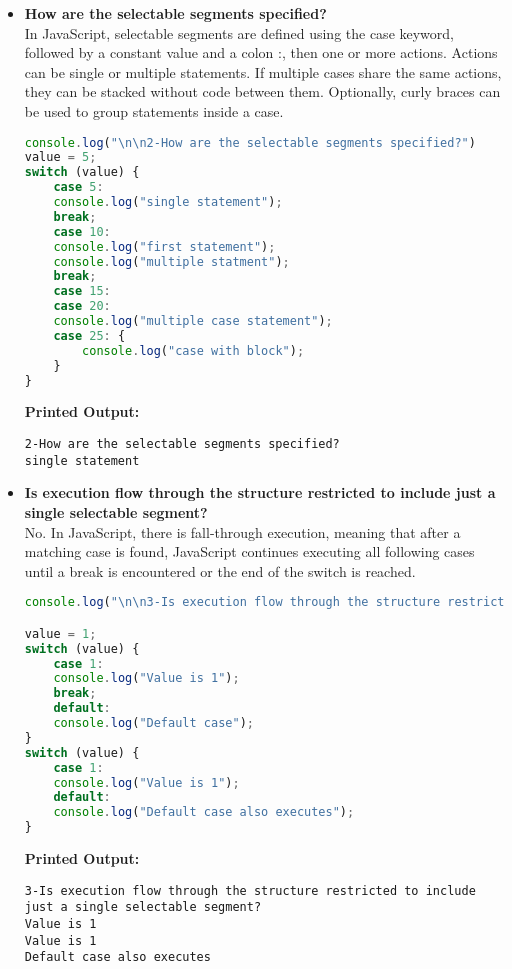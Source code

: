 \documentclass{article}
\begin{document}
\begin{itemize}
\item \textbf{How are the selectable segments specified?} \\
In JavaScript, selectable segments are defined using the case keyword, followed by a constant value and a colon :, then one or more actions. Actions can be single or multiple statements. If multiple cases share the same actions, they can be stacked without code between them. Optionally, curly braces {} can be used to group statements inside a case.
\begin{lstlisting}[language=JavaScript]
console.log("\n\n2-How are the selectable segments specified?")
value = 5;
switch (value) {
    case 5:
    console.log("single statement");
    break;
    case 10:
    console.log("first statement");
    console.log("multiple statment");
    break;
    case 15:
    case 20:
    console.log("multiple case statement");
    case 25: {
        console.log("case with block");
    }
}
\end{lstlisting}
\textbf{Printed Output:} 
\begin{verbatim}
2-How are the selectable segments specified?
single statement
\end{verbatim}



\item \textbf{Is execution flow through the structure restricted to include just a single selectable segment?} \\
No. In JavaScript, there is fall-through execution, meaning that after a matching case is found, JavaScript continues executing all following cases until a break is encountered or the end of the switch is reached.
\begin{lstlisting}[language=JavaScript]
console.log("\n\n3-Is execution flow through the structure restricted to include just a single selectable segment?");

value = 1;
switch (value) {
    case 1:
    console.log("Value is 1");
    break;
    default:
    console.log("Default case");
}
switch (value) {
    case 1:
    console.log("Value is 1");
    default:
    console.log("Default case also executes");
}
\end{lstlisting}
\textbf{Printed Output:} 
\begin{verbatim}
3-Is execution flow through the structure restricted to include just a single selectable segment?
Value is 1
Value is 1
Default case also executes
\end{verbatim}




\end{itemize}
\end{document}
